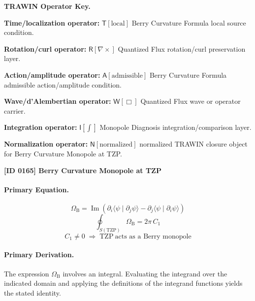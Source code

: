 \par\vspace{0.45\baselineskip}
\noindent\begin{minipage}[t]{\linewidth}
\begingroup
\small
\raggedright
\textbf{TRAWIN Operator Key.}\par
\noindent\textbf{Time/localization operator:} $\mathsf{T}\!\left[\mathrm{local}\right]$ Berry Curvature Formula local source condition.\par
\noindent\textbf{Rotation/curl operator:} $\mathsf{R}\!\left[\nabla\times\right]$ Quantized Flux rotation/curl preservation layer.\par
\noindent\textbf{Action/amplitude operator:} $\mathsf{A}\!\left[\mathrm{admissible}\right]$ Berry Curvature Formula admissible action/amplitude condition.\par
\noindent\textbf{Wave/d'Alembertian operator:} $\mathsf{W}\!\left[\Box\right]$ Quantized Flux wave or operator carrier.\par
\noindent\textbf{Integration operator:} $\mathsf{I}\!\left[\int\right]$ Monopole Diagnosis integration/comparison layer.\par
\noindent\textbf{Normalization operator:} $\mathsf{N}\!\left[\mathrm{normalized}\right]$ normalized TRAWIN closure object for Berry Curvature Monopole at TZP.\par
\endgroup
\end{minipage}

\clearpage
\noindent\textbf{[ID 0165] Berry Curvature Monopole at TZP}\par
\vspace{0.35em}
\paragraph{Primary Equation.}
\[
\Omega_{\mathrm{B}}
=
\operatorname{Im}\!\left(
\partial_i\langle\psi\mid \partial_j\psi\rangle
-\partial_j\langle\psi\mid \partial_i\psi\rangle
\right)
\]
\[
\oint_{S(\mathrm{TZP})}\Omega_{\mathrm{B}}=2\pi\,C_1
\]
\[
C_1\neq 0
\;\Longrightarrow\;
\mathrm{TZP}\ \text{acts as a Berry monopole}
\]

\paragraph{Primary Derivation.}
The expression \( \Omega_{\mathrm{B}} \) involves an integral. Evaluating the integrand over the indicated domain and applying the definitions of the integrand functions yields the stated identity.

